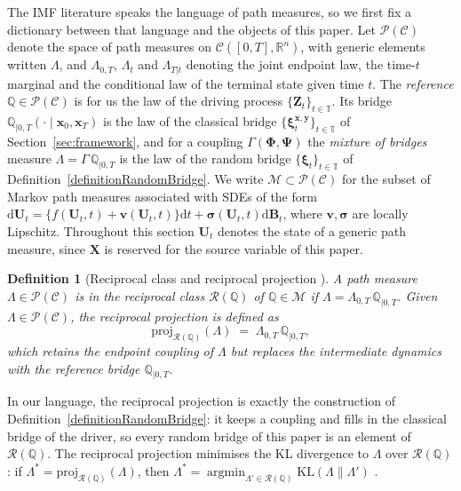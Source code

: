 \documentclass{article}
\newtheorem{defn}[thm]{Definition}
\def\R{\mathbb{R}}
\def\T{\mathbb{T}}
\def\dd{\mathrm{d}}
\def\xib{\boldsymbol{\xi}}
\DeclareMathOperator*{\argmin}{argmin}
\theoremstyle{definition}
\begin{document}
The IMF literature speaks the language of path measures, so we first fix a dictionary between that language and the objects of this paper. Let $\mathcal{P}(\mathcal{C})$ denote the space of path measures on $\mathcal{C}([0,T], \R^n)$, with generic elements written $\Lambda$, and $\Lambda_{0,T}$, $\Lambda_t$ and $\Lambda_{T|t}$ denoting the joint endpoint law, the time-$t$ marginal and the conditional law of the terminal state given time $t$. The \emph{reference} $\mathbb{Q} \in \mathcal{P}(\mathcal{C})$ is for us the law of the driving process $\{\boldsymbol{Z}_t\}_{t\in\T}$. Its bridge $\mathbb{Q}_{|0,T}(\cdot \mid \boldsymbol{x}_0, \boldsymbol{x}_T)$ is the law of the classical bridge $\{\xib^{\boldsymbol{x},\boldsymbol{y}}_t\}_{t\in\T}$ of Section~\ref{sec:framework}, and for a coupling $\Gamma(\boldsymbol{\Phi}, \boldsymbol{\Psi})$ the \emph{mixture of bridges} measure $\Lambda = \Gamma\,\mathbb{Q}_{|0,T}$ is the law of the random bridge $\{\xib_t\}_{t\in\T}$ of Definition~\ref{definitionRandomBridge}. We write $\mathcal{M} \subset \mathcal{P}(\mathcal{C})$ for the subset of Markov path measures associated with SDEs of the form $\dd\boldsymbol{U}_t = \{f(\boldsymbol{U}_t, t) + \boldsymbol{v}(\boldsymbol{U}_t, t)\}\dd t + \boldsymbol{\sigma}(\boldsymbol{U}_t, t)\dd\boldsymbol{B}_t$, where $\boldsymbol{v}, \boldsymbol{\sigma}$ are locally Lipschitz. Throughout this section $\boldsymbol{U}_t$ denotes the state of a generic path measure, since $\boldsymbol{X}$ is reserved for the source variable of this paper.

\begin{defn}[Reciprocal class and reciprocal projection {\cite[Definition~3]{shi2023diffusion}}]
\label{def:reciprocal}
A path measure $\Lambda \in \mathcal{P}(\mathcal{C})$ is in the \emph{reciprocal class} $\mathcal{R}(\mathbb{Q})$ of $\mathbb{Q} \in \mathcal{M}$ if $\Lambda = \Lambda_{0,T}\,\mathbb{Q}_{|0,T}$. Given $\Lambda \in \mathcal{P}(\mathcal{C})$, the \emph{reciprocal projection} is defined as
\begin{equation*}
    \mathrm{proj}_{\mathcal{R}(\mathbb{Q})}(\Lambda) \;=\; \Lambda_{0,T}\,\mathbb{Q}_{|0,T}, \label{eq:def_reciprocal_proj}
\end{equation*}
which retains the endpoint coupling of $\Lambda$ but replaces the intermediate dynamics with the reference bridge $\mathbb{Q}_{|0,T}$.
\end{defn}

In our language, the reciprocal projection is exactly the construction of Definition~\ref{definitionRandomBridge}: it keeps a coupling and fills in the classical bridge of the driver, so every random bridge of this paper is an element of $\mathcal{R}(\mathbb{Q})$. The reciprocal projection minimises the KL divergence to $\Lambda$ over $\mathcal{R}(\mathbb{Q})$: if $\Lambda^* = \mathrm{proj}_{\mathcal{R}(\mathbb{Q})}(\Lambda)$, then $\Lambda^* = \argmin_{\Lambda' \in \mathcal{R}(\mathbb{Q})} \mathrm{KL}(\Lambda \| \Lambda')$ \cite[Proposition~4]{shi2023diffusion}.
\end{document}
